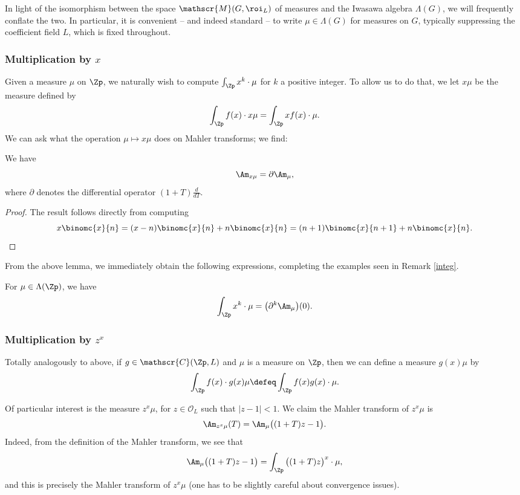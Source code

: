 \documentclass[a4paper,10pt, english, reqno]{smfart}
\newcommand{\sM}{\mathscr{M}}
\newcommand{\sC}{\mathscr{C}}
\numberwithin{equation}{section}
\begin{document}
\begin{notation}
	In light of the isomorphism between the space  $\sM(G,\roi_L)$ of measures and the Iwasawa algebra $\Lambda(G)$, we will frequently conflate the two. In particular, it is convenient -- and indeed standard -- to write $\mu \in \Lambda(G)$ for measures on $G$, typically suppressing the coefficient field $L$, which is fixed throughout.
\end{notation}


\subsubsection{Multiplication by $x$}\label{sec:mult by x}
Given a measure $\mu$ on $\Zp$, we naturally wish to compute $\int_{\Zp}x^k \cdot \mu$ for $k$ a positive integer. To allow us to do that, we let $x\mu$ be the measure defined by
\[
\int_{\Zp} f(x) \cdot x\mu = \int_{\Zp} xf(x) \cdot\mu.
\]
We can ask what the operation $\mu \mapsto x\mu$ does on Mahler transforms; we find:

\begin{lemma} \label{LemmaMultiplicationbyx}
We have
\[\Am_{x\mu} = \partial\Am_\mu,\]
where $\partial$ denotes the differential operator $(1+T)\frac{d}{dT}$.
\end{lemma}

\begin{proof}
The result follows directly from computing
\[  x\binomc{x}{n} = (x-n)\binomc{x}{n} + n\binomc{x}{n} = (n+1)\binomc{x}{n+1} + n\binomc{x}{n}. \qedhere\]
\end{proof}

From the above lemma, we immediately obtain the following expressions, completing the examples seen in Remark \ref{integ}.

\begin{corollary}\label{cor:eval at x^k}
For $\mu \in \Lambda(\Zp)$, we have
\[\int_{\Zp}x^k \cdot \mu = \big(\partial^k \Am_{\mu}\big)(0).\]
\end{corollary}

\subsubsection{Multiplication by $z^x$}

Totally analogously to above, if $g \in \sC(\Zp,L)$ and $\mu$ is a measure on $\Zp$, then we can define a measure $g(x)\mu$ by 
\[
\int_{\Zp} f(x) \cdot g(x)\mu \defeq \int_{\Zp} f(x)g(x) \cdot \mu.
\]

Of particular interest is the measure $z^x\mu$, for $z \in \mathscr{O}_L$ such that $|z-1| < 1$. We claim the Mahler transform of $z^x \mu$ is
\[\Am_{z^x \mu}(T) = \Am_{\mu}\big((1+T)z - 1\big).\]
Indeed, from the definition of the Mahler transform, we see that
\[\Am_{\mu}\big((1+T)z - 1\big) = \int_{\Zp}\big((1+T)z\big)^x \cdot\mu,\]
and this is precisely the Mahler transform of $z^x \mu$ (one has to be slightly careful about convergence issues). 
\end{document}
